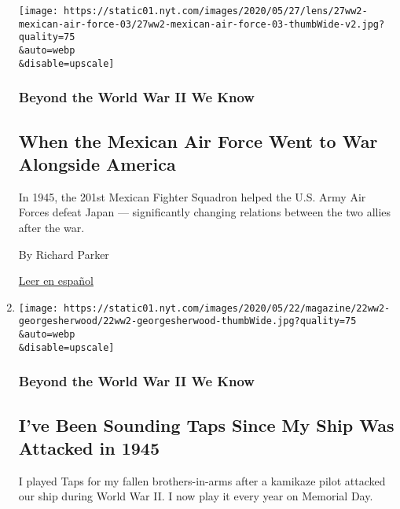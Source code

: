\begin{enumerate}
  \texttt{[image: https://static01.nyt.com/images/2020/05/27/lens/27ww2-mexican-air-force-03/27ww2-mexican-air-force-03-thumbWide-v2.jpg?quality=75\\\&auto=webp\\\&disable=upscale]}

  \hypertarget{beyond-the-world-war-ii-we-know-8}{%
  \subsubsection{Beyond the World War II We
  Know}\label{beyond-the-world-war-ii-we-know-8}}

  \hypertarget{when-the-mexican-air-force-went-to-war-alongside-america}{%
  \subsection{When the Mexican Air Force Went to War Alongside
  America}\label{when-the-mexican-air-force-went-to-war-alongside-america}}

  In 1945, the 201st Mexican Fighter Squadron helped the U.S. Army Air
  Forces defeat Japan --- significantly changing relations between the
  two allies after the war.

  By Richard Parker

  \href{https://www.nytimes.com/es/2020/05/27/magazine/mexico-escuadron-201-segunda-guerra-mundial.html}{Leer
  en español}
\item
  \href{/2020/05/21/magazine/taps-memorial-day.html}{}

  \texttt{[image: https://static01.nyt.com/images/2020/05/22/magazine/22ww2-georgesherwood/22ww2-georgesherwood-thumbWide.jpg?quality=75\\\&auto=webp\\\&disable=upscale]}

  \hypertarget{beyond-the-world-war-ii-we-know-9}{%
  \subsubsection{Beyond the World War II We
  Know}\label{beyond-the-world-war-ii-we-know-9}}

  \hypertarget{ive-been-sounding-taps-since-my-ship-was-attacked-in-1945}{%
  \subsection{I've Been Sounding Taps Since My Ship Was Attacked in
  1945}\label{ive-been-sounding-taps-since-my-ship-was-attacked-in-1945}}

  I played Taps for my fallen brothers-in-arms after a kamikaze pilot
  attacked our ship during World War II. I now play it every year on
  Memorial Day.


\end{enumerate}

